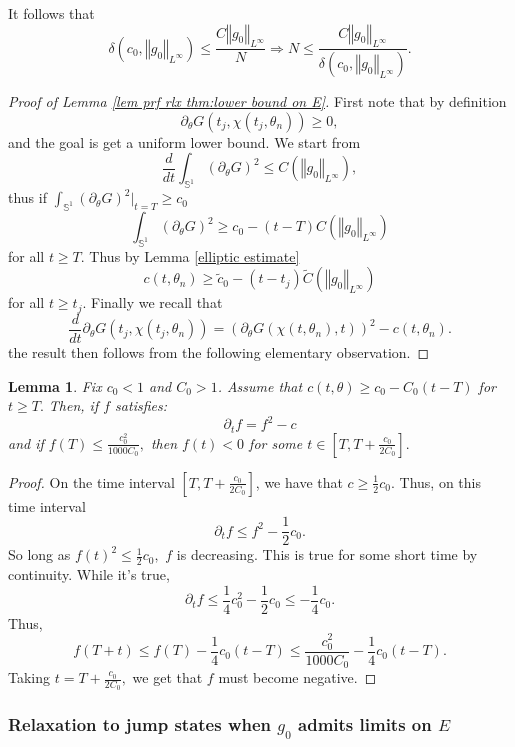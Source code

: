 \documentclass[10pt]{article}
\numberwithin{equation}{section}
\theoremstyle{plain}
\newtheorem{lemma}{Lemma}[section]
\theoremstyle{definition}
\newcommand{\prt}[1]{\left( #1 \right)}
\newcommand{\norm}[1]{\left\Vert #1 \right\Vert}
\numberwithin{equation}{section}
\begin{document}
It follows that 
\[\delta(c_0,\norm{g_0}_{L^\infty})\leq \frac{C\norm{g_0}_{L^\infty}}{N}\Longrightarrow N\leq \frac{C\norm{g_0}_{L^\infty}}{\delta(c_0,\norm{g_0}_{L^\infty})}.\]
 \begin{proof}[Proof of Lemma \ref{lem prf rlx thm:lower bound on E}]
 First note that by definition 
 \[\partial_\theta G(t_j,\chi(t_j,\theta_n))\geq 0,\]
and the goal is get a uniform lower bound. We start from
\[\frac{d}{dt} \int_{\mathbb{S}^1}(\partial_\theta G)^2 \leq C(\norm{g_0}_{L^\infty}),\]
thus if $\int_{\mathbb{S}^1}(\partial_\theta G)^2|_{t=T}\geq c_0$ 
\[\int_{\mathbb{S}^1}(\partial_\theta G)^2\geq c_0-(t-T) C(\norm{g_0}_{L^\infty})\] for all $t\geq T.$
Thus by Lemma \ref{elliptic estimate} 
\[c(t,\theta_n)\geq \tilde{c}_0-(t-t_j) \tilde{C}(\norm{g_0}_{L^\infty})\] 
for all $t\geq t_j$. Finally we recall that
\[
\frac{d}{dt}\partial_\theta G(t_j,\chi(t_j,\theta_n))=\prt{\partial_\theta G(\chi(t,\theta_n),t)}^2-c(t,\theta_n).
\]
the result then follows from the following elementary observation.
 \end{proof}

\begin{lemma}
Fix $c_0<1$ and $C_0>1$. 
Assume that $c(t,\theta)\geq c_0-C_0 (t-T)$ for $t\geq T.$ Then, if $f$ satisfies:
\[\partial_t f=f^2-c\] and if $f(T)\leq \frac{c_0^2}{1000C_0},$ then $f(t)<0$ for some $t\in [T,T+\frac{c_0}{2C_0}].$  
\end{lemma}
\begin{proof}
On the time interval $[T,T+\frac{c_0}{2C_0}]$, we have that $c\geq \frac{1}{2}c_0.$ Thus, on this time interval
\[\partial_t f\leq f^2-\frac{1}{2}c_0.\] So long as $f(t)^2\leq \frac{1}{2}c_0,$ $f$ is decreasing. This is true for some short time by continuity. While it's true,
\[\partial_t f\leq \frac{1}{4}c_0^2-\frac{1}{2}c_0\leq -\frac{1}{4}c_0.\] Thus, 
\[f(T+t)\leq f(T)-\frac{1}{4}c_0(t-T)\leq \frac{c_0^2}{1000 C_0}-\frac{1}{4}c_0(t-T).\]
Taking $t=T+\frac{c_0}{2C_0},$ we get that $f$ must become negative. 
\end{proof}

\subsubsection{Relaxation to jump states when $g_0$ admits limits on $E$}
\end{document}
